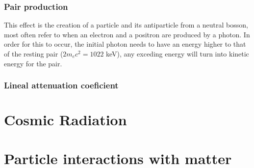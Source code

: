 \subsubsection{Pair production}

This effect is the creation of a particle and its antiparticle from a neutral bosson, most often refer to when an electron and a positron are produced by a photon. In order for this to occur, the initial photon needs to have an energy higher to that of the resting pair ($2m_e c^2=1022$ \unit{\kilo\eV}), any exceding energy will turn into kinetic energy for the pair. 

\subsubsection{Lineal attenuation coeficient}

\section{Cosmic Radiation}

\section{Particle interactions with matter}